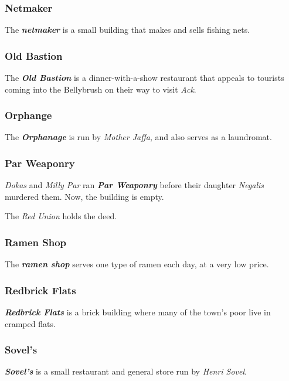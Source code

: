 \documentclass[11pt]{teraum_adventure}
\begin{document}
\subsubsection*{Netmaker}
\label{sec:org30c7c79}
The \textbf{\emph{netmaker}} is a small building that makes and sells fishing nets.
\subsubsection*{Old Bastion}
\label{sec:org8e661e0}
The \textbf{\emph{Old Bastion}} is a dinner-with-a-show restaurant that appeals to
tourists coming into the Bellybrush on their way to visit \emph{Ack}.
\subsubsection*{Orphange}
\label{sec:orgc117d80}
The \textbf{\emph{Orphanage}} is run by \emph{Mother Jaffa}, and also serves as a
laundromat.
\subsubsection*{Par Weaponry}
\label{sec:org9bd6d02}
\emph{Dokas} and \emph{Milly Par} ran \textbf{\emph{Par Weaponry}} before their daughter
\emph{Negalis} murdered them. Now, the building is empty.

The \emph{Red Union} holds the deed.
\subsubsection*{Ramen Shop}
\label{sec:orgfc385ba}
The \textbf{\emph{ramen shop}} serves one type of ramen each day, at a very low
price.
\subsubsection*{Redbrick Flats}
\label{sec:orge25780c}
\textbf{\emph{Redbrick Flats}} is a brick building where many of the town's poor
live in cramped flats.
\subsubsection*{Sovel's}
\label{sec:orgc0fb1ae}
\textbf{\emph{Sovel's}} is a small restaurant and general store run by \emph{Henri
Sovel}.
\end{document}
